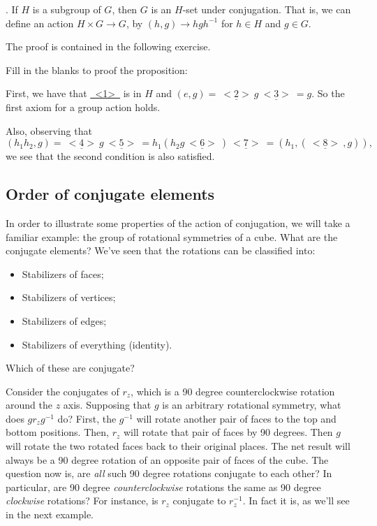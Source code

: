 \begin{prop}\label{proposition:actions:HSetCojugation}. If $H$ is a subgroup of $G$, then $G$ is an $H$-set under conjugation.  That is, we can define an action $H \times G\rightarrow G$, by $(h, g) \rightarrow hgh^{-1}$ for $h\in H$ and $g\in G$. 
\end{prop}
The proof is contained in the following exercise.

\begin{exercise}\label{exercise:actions:Conj8}
Fill in the blanks to proof the proposition:

\noindent
First, we have that \underline{~<1>~} is in  $H$ and $(e, g) = \underline{~<2>~}g\underline{~<3>~} = g$.
So the first axiom for a group action holds. 

Also, observing that
\[(h_1h_2,g) = \underline{~<4>~}g\underline{~<5>~}
= h_1(h_2g\underline{~<6>~} )\underline{~<7>~}
= (h_1, (\underline{~<8>~}, g)),\]
we see that the second condition is also satisfied.
\end{exercise}


%

\subsection*{Order of conjugate elements}

In order to illustrate some properties of the action of conjugation, we will take a familiar example: the group of rotational symmetries of a cube.
What are the conjugate elements?
We've seen that the rotations can be classified into:
\begin{itemize}
\item
Stabilizers of faces;
\item
Stabilizers of vertices;
\item
Stabilizers of edges;
\item
Stabilizers of everything (identity).
\end{itemize}
Which of these are conjugate? 


Consider the conjugates of $r_z$, which is a 90 degree counterclockwise rotation around the $z$ axis. Supposing that $g$ is an arbitrary rotational symmetry, what does $g r_z g^{-1}$ do? First, the $g^{-1}$ will rotate another pair of faces to the top and bottom positions. Then, $r_z$ will rotate that pair of faces by 90 degrees. Then $g$ will rotate the two rotated faces back to their original places. The net result will always be a 90 degree rotation of an opposite pair of faces of the cube. 
The question now is, are \emph{all} such 90 degree rotations conjugate to each other? In particular, are 90 degree \emph{counterclockwise} rotations the same as 90 degree \emph{clockwise} rotations? For instance, is $r_z$ conjugate to $r_z^{-1}$.  In fact it is, as we'll see in the next example.

